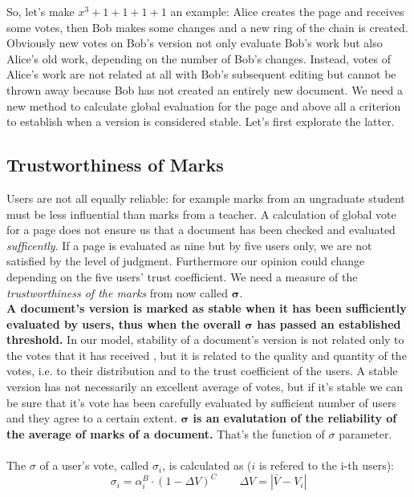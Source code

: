 \documentclass[a4paper,11pt]{article}
\newcommand{\sg}{$\sigma$ }
\begin{document}
So, let's make $x^3 + 1+ 1+ 1+ 1$ an example: Alice creates the page and receives some votes, then Bob makes 
some changes and a new ring of the chain is created. Obviously new votes on Bob's version 
not only evaluate Bob's work but also Alice's old work, depending on the number of Bob's 
changes. Instead, votes of Alice's work are not related at all with Bob's subsequent editing 
but cannot be thrown away because Bob has not created an entirely new document. We need a 
new method to calculate global evaluation for the page and above all a criterion to 
establish when a version is considered stable. Let's first explorate the latter.

\subsection{Trustworthiness of Marks} \label{sec:sigma}
Users are not all equally reliable: for example marks from an ungraduate student must be 
less influential than marks from a teacher. A calculation of global vote for a page does 
not ensure us that a document has been checked and evaluated \emph{sufficently}. If a page 
is evaluated as nine but by five users only, we are not satisfied by the level of judgment. Furthermore our opinion could change depending on the five users' trust coefficient. We need a measure of the \emph{trustworthiness of the marks} from now called $\boldsymbol{\sigma}$. \\ \textbf{A document's version is marked as stable when it has been sufficiently evaluated by users, thus when the overall $\boldsymbol{\sigma}$ has passed an established threshold.} In our model, stability of a document's version is not related only to the votes that it has received , but it is related to the quality and quantity of the votes, i.e. to their distribution and to the trust coefficient of the users. A stable version has not necessarily an excellent average of votes, but if it's stable we can be sure that it's vote has been carefully evaluated by sufficient number of users and they agree to a certain extent. \textbf{ $\boldsymbol{\sigma}$ is an evalutation of the reliability of the average of marks of a document.} That's the function of \sg parameter.
\\ \\The \sg of a user's vote, called $\sigma_i$, is calculated as ($i$ is refered to the i-th users):
\begin{equation} \label{eq:single_sigma}
\sigma_i = \alpha_i^B \cdot \left(1- \Delta V\right)^C \qquad \Delta V = |\bar{V}- V_i| 
\end{equation}
\end{document}
